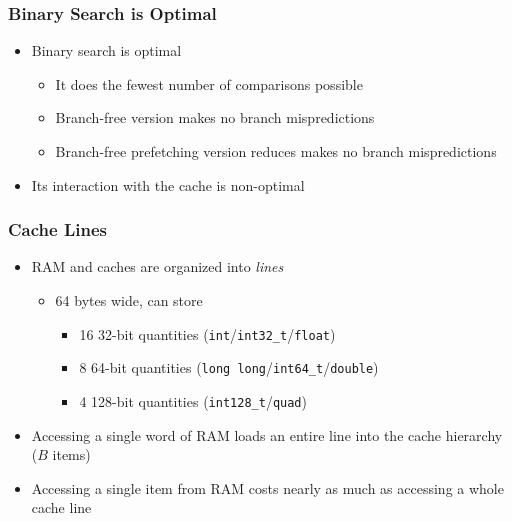 \documentclass[xcolor=dvipsnames]{beamer}
\begin{document}
\begin{frame}
   \frametitle{Binary Search is Optimal}

   \begin{itemize}
     \item<+-> Binary search is optimal 
     \begin{itemize}
       \item It does the fewest number of comparisons possible
       \item Branch-free version makes no branch mispredictions
       \item Branch-free prefetching version reduces makes no branch mispredictions
     \end{itemize}
     \item<+-> Its interaction with the cache is non-optimal
   \end{itemize}
\end{frame}

\begin{frame}
   \frametitle{Cache Lines}

   \begin{itemize}
      \item<+-> RAM and caches are organized into \emph{lines}
      \begin{itemize}
        \item<+-> 64 bytes wide, can store
        \begin{itemize}
        \item 16 32-bit quantities (\texttt{int}/\texttt{int32_t}/\texttt{float})
        \item 8 64-bit quantities (\texttt{long long}/\texttt{int64_t}/\texttt{double})
        \item 4 128-bit quantities (\texttt{int128_t}/\texttt{quad})
        \end{itemize}
      \end{itemize}
      \item<+-> Accessing a single word of RAM loads an entire line
         into the cache hierarchy ($B$ items)
   \end{itemize}
   \begin{center}
   \end{center}
   \begin{itemize}
        \item<+->Accessing a single item from RAM costs nearly as much as accessing a whole cache line
   \end{itemize}
\end{frame}
\end{document}
